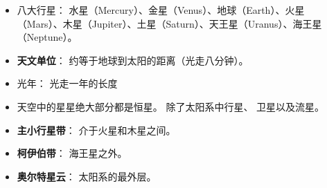 
\begin{issues}
\issueDraft
\end{issues}

\begin{itemize}
\item 八大行星： 水星（Mercury）、金星（Venus）、地球（Earth）、火星（Mars）、木星（Jupiter）、土星（Saturn）、天王星（Uranus）、海王星（Neptune）。
\item \textbf{天文单位}： 约等于地球到太阳的距离（光走八分钟）。
\item 光年： 光走一年的长度
\item 天空中的星星绝大部分都是恒星。 除了太阳系中行星、 卫星以及流星。
\item \textbf{主小行星带}： 介于火星和木星之间。
\item \textbf{柯伊伯带}： 海王星之外。
\item \textbf{奥尔特星云}： 太阳系的最外层。
\end{itemize}
